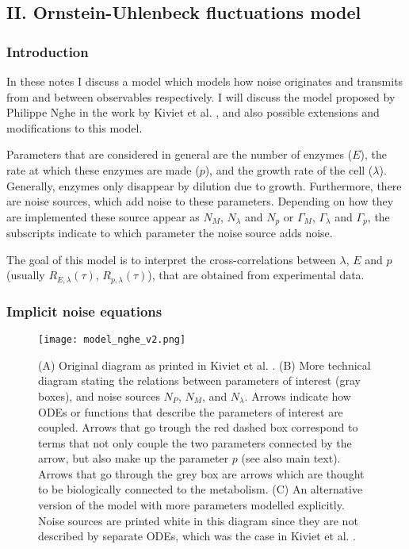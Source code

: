 


\subsection*{II. Ornstein-Uhlenbeck fluctuations model}

\subsubsection*{Introduction}

In these notes I discuss a model which models how noise originates and transmits from and between observables respectively. I will discuss the model proposed by Philippe Nghe in the work by Kiviet et al. \cite{Kiviet2014}, and also possible extensions and modifications to this model.

Parameters that are considered in general are the number of enzymes ($E$), the rate at which these enzymes are made ($p$), and the growth rate of the cell ($\lambda$). Generally, enzymes only disappear by dilution due to growth. Furthermore, there are noise sources, which add noise to these parameters. Depending on how they are implemented these source appear as $N_M$, $N_\lambda$ and $N_p$ or $\Gamma_M$, $\Gamma_\lambda$ and $\Gamma_p$, the subscripts indicate to which parameter the noise source adds noise.

The goal of this model is to interpret the cross-correlations between $\lambda$, $E$ and $p$ (usually $R_{E,\lambda}(\tau)$, $R_{p,\lambda}(\tau)$), that are obtained from experimental data.

\subsubsection*{Implicit noise equations}


\begin{figure}
	\centering
	\texttt{[image: model\_nghe\_v2.png]}
	\caption{ 
		(A) Original diagram as printed in Kiviet et al. \cite{Kiviet2014}.
		(B) More technical diagram stating the relations between parameters of interest (gray boxes), and noise sources $N_P$, $N_M$, and $N_\lambda$. Arrows indicate how ODEs or functions that describe the parameters of interest are coupled. 
		Arrows that go trough the red dashed box correspond to terms that not only couple the two parameters connected by the arrow, but also make up the parameter $p$ (see also main text).
		Arrows that go through the grey box are arrows which are thought to be biologically connected to the metabolism.
		(C) An alternative version of the model with more parameters modelled explicitly. Noise sources are printed white in this diagram since they are not described by separate ODEs, which was the case in Kiviet et al. \cite{Kiviet2014}. 
	}
	\label{fig:modeldrawing}
\end{figure}

